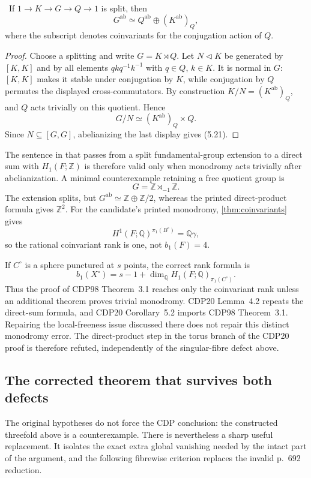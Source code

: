 \begin{lemma}
\label{lem:semidirect-abelianization}
\Verified\ If
$1\to K\to G\to Q\to1$ is split, then
\[
G^{\mathrm{ab}}\simeq
Q^{\mathrm{ab}}\oplus(K^{\mathrm{ab}})_Q,
\tag{5.21}
\]
where the subscript denotes coinvariants for the conjugation action of $Q$.
\end{lemma}

\begin{proof}
Choose a splitting and write $G=K\rtimes Q$.  Let $N\triangleleft K$ be
generated by $[K,K]$ and by all elements
$qkq^{-1}k^{-1}$ with $q\in Q$, $k\in K$.  It is normal in $G$:
$[K,K]$ makes it stable under conjugation by $K$, while conjugation by
$Q$ permutes the displayed cross-commutators.  By construction
$K/N=(K^{\mathrm{ab}})_Q$, and $Q$ acts trivially on this quotient.  Hence
\[
G/N\simeq(K^{\mathrm{ab}})_Q\times Q.
\]
Since $N\subseteq[G,G]$, abelianizing the last display gives (5.21).
\end{proof}

The sentence in \cite[Lemma~3.2, pp.~84--85]{CDP1998} that passes from a
split fundamental-group extension to a direct sum with $H_1(F;\mathbb Z)$
is therefore valid only when monodromy acts trivially after abelianization.
A minimal counterexample retaining a free quotient group is
\[
G=\mathbb Z\rtimes_{-1}\mathbb Z.
\]
The extension splits, but
$G^{\mathrm{ab}}\simeq\mathbb Z\oplus\mathbb Z/2$, whereas the printed
direct-product formula gives $\mathbb Z^2$.
For the candidate's printed monodromy, \cref{thm:coinvariants} gives
\[
H^1(F;\mathbb Q)^{\pi_1(B^\circ)}=\mathbb Q\gamma,
\]
so the rational coinvariant rank is one, not
$b_1(F)=4$.

If $C^\circ$ is a sphere punctured at $s$ points, the correct rank formula is
\[
b_1(X^\circ)=s-1+
\dim_{\mathbb Q}H_1(F;\mathbb Q)_{\pi_1(C^\circ)}.
\tag{5.22}
\]
Thus the proof of CDP98 Theorem~3.1 reaches only the coinvariant rank unless
an additional theorem proves trivial monodromy.  CDP20 Lemma~4.2 repeats the
direct-sum formula, and CDP20 Corollary~5.2 imports CDP98 Theorem~3.1.
Repairing the local-freeness issue discussed there does not repair this
distinct monodromy error.  The direct-product step in the torus branch of the
CDP20 proof is therefore refuted, independently of the singular-fibre defect
above.

\subsection{The corrected theorem that survives both defects}

The original hypotheses do not force the CDP conclusion: the constructed
threefold above is a counterexample.  There is nevertheless a sharp useful
replacement.  It isolates the exact extra global vanishing needed by the
intact part of the argument, and the following fibrewise criterion replaces
the invalid p.~692 reduction.

